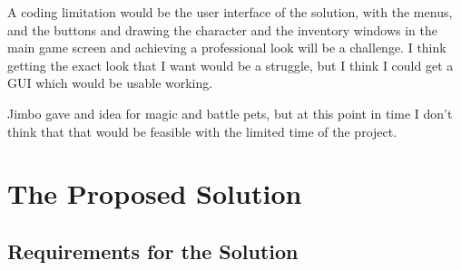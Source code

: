 \documentclass[12pt]{article}
\begin{document}
A coding limitation would be the user interface of the solution, with the menus, and the buttons and drawing the character and the inventory windows in the main game screen and achieving a professional look will be a challenge. I think getting the exact look that I want would be a struggle, but I think I could get a GUI which would be usable working.

Jimbo gave and idea for magic and battle pets, but at this point in time I don’t think that that would be feasible with the limited time of the project.


	\section{The Proposed Solution}

		\subsection{Requirements for the Solution}
\end{document}
